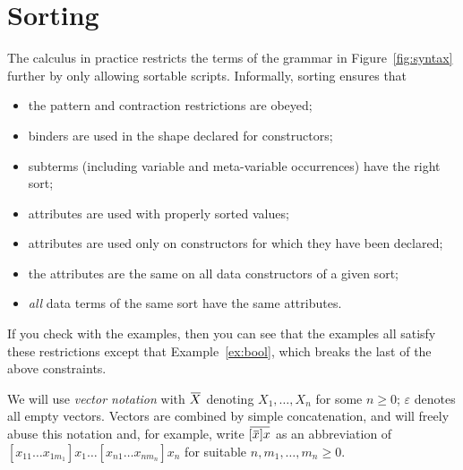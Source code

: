 \documentclass[letterpaper,11pt]{article}
\begin{document}


\section{\bhax Sorting}
\label{sec:sorting}

The \hax calculus in practice restricts the terms of the grammar in Figure~\ref{fig:syntax} further
by only allowing sortable scripts. Informally, sorting ensures that
\begin{itemize}
\item the pattern and contraction restrictions are obeyed;
\item binders are used in the shape declared for constructors;
\item subterms (including variable and meta-variable occurrences) have the right sort;
\item attributes are used with properly sorted values;
\item attributes are used only on constructors for which they have been declared;
\item the attributes are the same on all data constructors of a given sort;
\item \emph{all} data terms of the same sort have the same attributes.
\end{itemize}
If you check with the examples, then you can see that the examples all satisfy these restrictions
except that Example~\ref{ex:bool}, which breaks the last of the above constraints. 

\begin{notation}[vectors]
  We will use \emph{vector notation} with $\ov{X}$ denoting $X_1,…,X_n$ for some $n≥0$; $ε$ denotes
  all empty vectors. Vectors are combined by simple concatenation, and will freely abuse this
  notation and, for example, write $\ov{[\ov{x}]x}$ as an abbreviation of
  $[x_{11}…x_{1m_1}]x_1…[x_{n1}…x_{nm_n}]x_n$ for suitable $n,m_1,…,m_n ≥ 0$.
\end{notation}
\end{document}
